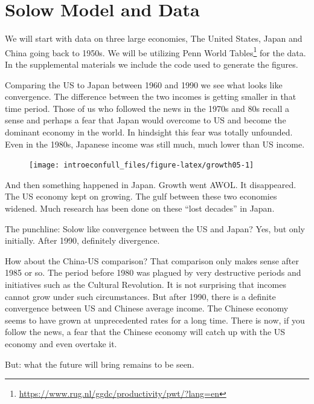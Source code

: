 \documentclass[
]{book}
\begin{document}
\hypertarget{solow-model-and-data}{%
\section{Solow Model and Data}\label{solow-model-and-data}}

We will start with data on three large economies, The United States, Japan and China going back to 1950s. We will be utilizing Penn World Tables\footnote{\url{https://www.rug.nl/ggdc/productivity/pwt/?lang=en}} for the data. In the supplemental materials we include the code used to generate the figures.

Comparing the US to Japan between 1960 and 1990 we see what looks like convergence. The difference between the two incomes is getting smaller in that time period. Those of us who followed the news in the 1970s and 80s recall a sense and perhaps a fear that Japan would overcome to US and become the dominant economy in the world. In hindsight this fear was totally unfounded. Even in the 1980s, Japanese income was still much, much lower than US income.

\begin{figure}

{\centering \texttt{[image: introeconfull\_files/figure-latex/growth05-1]} 

}

\end{figure}

And then something happened in Japan. Growth went AWOL. It disappeared. The US economy kept on growing. The gulf between these two economies widened. Much research has been done on these ``lost decades'' in Japan.

The punchline: Solow like convergence between the US and Japan? Yes, but only initially. After 1990, definitely divergence.

How about the China-US comparison? That comparison only makes sense after 1985 or so. The period before 1980 was plagued by very destructive periods and initiatives such as the Cultural Revolution. It is not surprising that incomes cannot grow under such circumstances. But after 1990, there is a definite convergence between US and Chinese average income. The Chinese economy seems to have grown at unprecedented rates for a long time. There is now, if you follow the news, a fear that the Chinese economy will catch up with the US economy and even overtake it.

But: what the future will bring remains to be seen.
\end{document}
